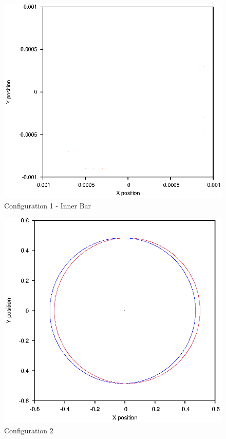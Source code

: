 \documentclass[a4paper,12pt]{article}
\begin{document}
\begin{figure}[H]
\centering
\includegraphics[width=.9\textwidth]{./results/stablebase/Inner.eps}
\caption{Configuration 1 - Inner Bar}
\label{fig:config1i}
\end{figure}

\begin{figure}[H]
\centering
\includegraphics[width=.9\textwidth]{./results/002-5-001/Orbit.eps}
\caption{Configuration 2}
\label{fig:config2}
\end{figure}
\end{document}
